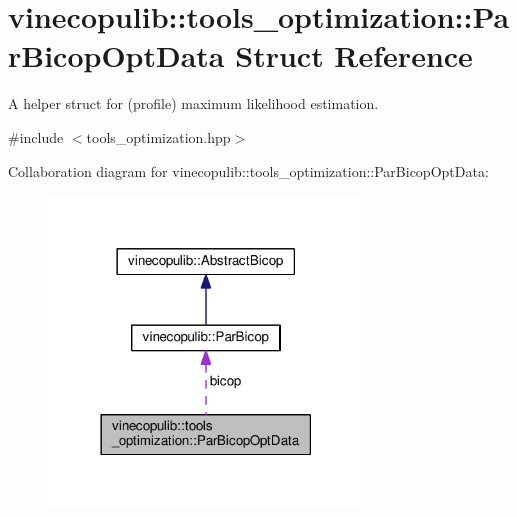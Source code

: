 \hypertarget{structvinecopulib_1_1tools__optimization_1_1_par_bicop_opt_data}{}\section{vinecopulib\+:\+:tools\+\_\+optimization\+:\+:Par\+Bicop\+Opt\+Data Struct Reference}
\label{structvinecopulib_1_1tools__optimization_1_1_par_bicop_opt_data}


A helper struct for (profile) maximum likelihood estimation.  




{\ttfamily \#include $<$tools\+\_\+optimization.\+hpp$>$}



Collaboration diagram for vinecopulib\+:\+:tools\+\_\+optimization\+:\+:Par\+Bicop\+Opt\+Data\+:\nopagebreak
\begin{figure}[H]
\begin{center}
\leavevmode
\includegraphics[width=237pt]{structvinecopulib_1_1tools__optimization_1_1_par_bicop_opt_data__coll__graph}
\end{center}
\end{figure}

